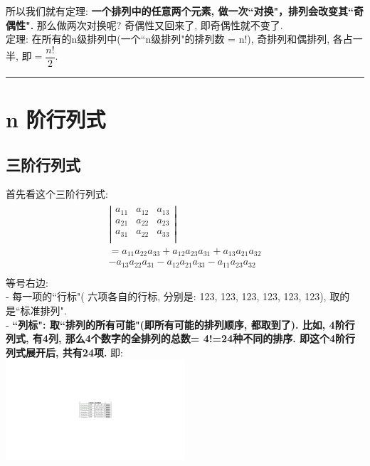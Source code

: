 \documentclass[UTF8]{ctexart}
\begin{document}
	所以我们就有定理: \textbf{一个排列中的任意两个元素, 做一次``对换"，排列会改变其``奇偶性".} 那么做两次对换呢? 奇偶性又回来了, 即奇偶性就不变了. \\
	
	定理: 在所有的n级排列中(一个``n级排列"的排列数 = n!), 奇排列和偶排列, 各占一半, 即$=\dfrac{n!}{2}$.\\
	
	

	\hrule

	
	\section{n 阶行列式}
	
	\subsection{三阶行列式}
	首先看这个三阶行列式: 
	\begin{align*}
		\begin{matrix}
			\left| \begin{matrix}
				a_{11}&		a_{12}&		a_{13}\\
				a_{21}&		a_{22}&		a_{23}\\
				a_{31}&		a_{22}&		a_{33}\\
			\end{matrix} \right|\\
			=a_{11}a_{22}a_{33}+a_{12}a_{23}a_{31}+a_{13}a_{21}a_{32}\\
			-a_{13}a_{22}a_{31}-a_{12}a_{21}a_{33}-a_{11}a_{23}a_{32}\\
		\end{matrix}
	\end{align*} 
	等号右边: \\
	- 每一项的``行标"( 六项各自的行标, 分别是: 123, 123, 123, 123, 123, 123), 取的是``标准排列".	\\
	- \textbf{``列标": 取``排列的所有可能"(即所有可能的排列顺序, 都取到了). 比如, 4阶行列式, 有4列, 那么4个数字的全排列的总数= 4!=24种不同的排序. 即这个4阶行列式展开后, 共有24项.}  即: \\
	\includegraphics[width=0.5\textwidth]{img/0002.pdf}\\
	
\end{document}
